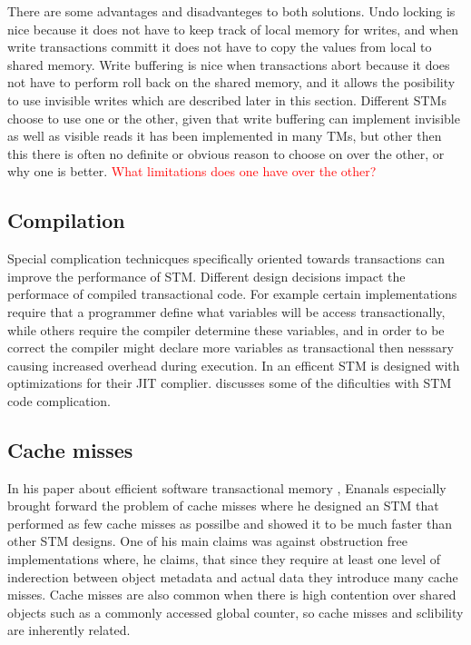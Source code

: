 There are some advantages and disadvanteges to both solutions.
Undo locking is nice because it does not have to keep track of local memory for writes, and when write transactions committ it does not have to copy the values from local to shared memory.
Write buffering is nice when transactions abort because it does not have to perform roll back on the shared memory, and it allows the posibility to use invisible writes which are described later in this section.
Different STMs choose to use one or the other, given that write buffering can implement invisible as well as visible reads it has been implemented in many TMs, but other then this there is often no definite or obvious reason to choose on over the other, or why one is better.
\textcolor{Red}{What limitations does one have over the other?}

\subsection{Compilation}
Special complication technicques specifically oriented towards transactions can improve the performance of STM.
Different design decisions impact the performace of compiled transactional code.
For example certain implementations require that a programmer define what variables will be access transactionally, while others require the compiler determine these variables, and in order to be correct the compiler might declare more variables as transactional then nesssary causing increased overhead during execution.
In \cite{1133985} an efficent STM is designed with optimizations for their JIT complier.
\cite{LPD-REPORT-2009-003} discusses some of the dificulties with STM code complication.

\subsection{Cache misses}
In his paper about efficient software transactional memory \cite{Ennals06softwaretransactional}, Enanals especially brought forward the problem of cache misses where he designed an STM that performed as few cache misses as possilbe and showed it to be much faster than other STM designs.
One of his main claims was against obstruction free implementations where, he claims, that since they require at least one level of inderection between object metadata and actual data they introduce many cache misses.
Cache misses are also common when there is high contention over shared objects such as a commonly accessed global counter, so cache misses and sclibility are inherently related.

